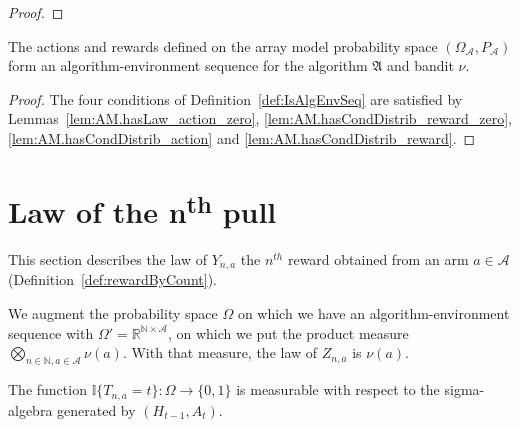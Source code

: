 \begin{proof}\leanok

\end{proof}

\begin{theorem}\label{thm:isAlgEnvSeq_arrayMeasure}
  \leanok
The actions and rewards defined on the array model probability space $(\Omega_{\mathcal{A}}, P_{\mathcal{A}})$ form an algorithm-environment sequence for the algorithm $\mathfrak{A}$ and bandit $\nu$.
\end{theorem}

\begin{proof}\leanok
The four conditions of Definition~\ref{def:IsAlgEnvSeq} are satisfied by Lemmas~\ref{lem:AM.hasLaw_action_zero}, \ref{lem:AM.hasCondDistrib_reward_zero}, \ref{lem:AM.hasCondDistrib_action} and \ref{lem:AM.hasCondDistrib_reward}.
\end{proof}




\section{Law of the n\textsuperscript{th} pull}\label{sec:alt_model}

This section describes the law of $Y_{n, a}$ the $n^{th}$ reward obtained from an arm $a \in \mathcal{A}$ (Definition~\ref{def:rewardByCount}).

We augment the probability space $\Omega$ on which we have an algorithm-environment sequence with $\Omega' = \mathbb{R}^{\mathbb{N} \times \mathcal{A}}$, on which we put the product measure $\bigotimes_{n \in \mathbb{N}, a \in \mathcal{A}} \nu(a)$.
With that measure, the law of $Z_{n,a}$ is $\nu(a)$.


\begin{lemma}\label{lem:measurable_comap_indicator_stepsUntil_eq}
  \leanok
The function $\mathbb{I}\{T_{n,a} = t\} : \Omega \to \{0, 1\}$ is measurable with respect to the sigma-algebra generated by $(H_{t-1}, A_t)$.
\end{lemma}

